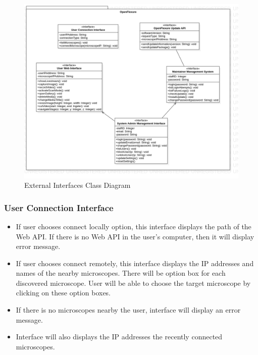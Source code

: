 \begin{figure}[H]
	\centering
	\includegraphics[scale=0.4]{Uml_Images/external_interfaces_class_diagram}
	\caption{External Interfaces Class Diagram}
	\label{fig:external_interfaces_class_diagram}
\end{figure}

\subsubsection{User Connection Interface}
\begin{itemize}
	\item If user chooses connect locally option, this interface displays the path of the Web API. If there is no Web API in the user's computer, then it will display error message.
	\item If user chooses connect remotely, this interface displays the IP addresses and names of the nearby microscopes. There will be option box for each discovered microscope. User will be able to choose the target microscope by clicking on these option boxes.
	\item If there is no microscopes nearby the user, interface will display an error message.
	\item Interface will also displays the  IP addresses the recently connected microscopes.
\end{itemize}

